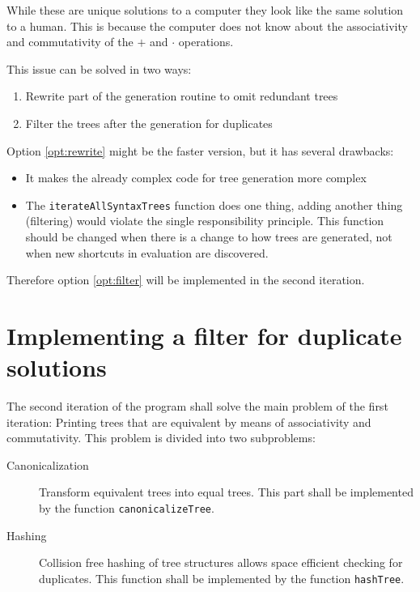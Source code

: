 \documentclass[11pt,a4paper]{article}
\newcommand{\code}[1]{\texttt{#1}}
\begin{document}
While these are unique solutions to a computer they look like the same
solution to a human. This is because the computer does not know about
the associativity and commutativity of the $+$ and $\cdot$
operations.

This issue can be solved in two ways:
\begin{enumerate}
\item \label{opt:rewrite} Rewrite part of the generation routine to
  omit redundant trees
\item \label{opt:filter} Filter the trees after the generation for
  duplicates
\end{enumerate}

Option \ref{opt:rewrite} might be the faster version, but it has
several drawbacks:
\begin{itemize}
\item It makes the already complex code for tree generation more
  complex
\item The \code{iterateAllSyntaxTrees} function does one thing,
  adding another thing (filtering) would violate the single
  responsibility principle.
  This function should be changed when there is a change to how trees
  are generated, not when new shortcuts in evaluation are discovered.
\end{itemize}

Therefore option \ref{opt:filter} will be implemented in the second iteration.

\section{Implementing a filter for duplicate solutions}

The second iteration of the program shall solve the main problem of
the first iteration:
Printing trees that are equivalent by means of associativity
and commutativity.
This problem is divided into two subproblems:
\begin{description}
\item[Canonicalization] Transform equivalent trees into equal trees.
  This part shall be implemented by the function
  \code{canonicalizeTree}.
\item[Hashing] Collision free hashing of tree structures allows space
  efficient checking for duplicates.
  This function shall be implemented by the function
  \code{hashTree}.
\end{description}
\end{document}
